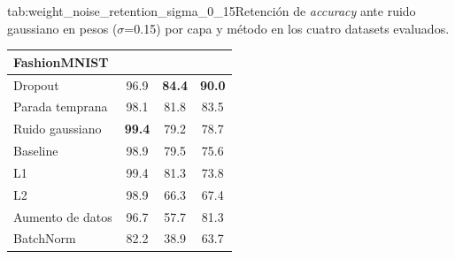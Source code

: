 \begin{table}{tab:weight_noise_retention_sigma_0_15}{Retención de \textit{accuracy} ante ruido gaussiano en pesos ($\sigma$=0.15) por capa y método en los cuatro datasets evaluados.}
\begin{tabular}{lccc}
\multicolumn{4}{l}{\textbf{FashionMNIST}}\\
\midrule
Dropout & 96.9 & \textbf{84.4} & \textbf{90.0} \\
Parada temprana & 98.1 & 81.8 & 83.5 \\
Ruido gaussiano & \textbf{99.4} & 79.2 & 78.7 \\
Baseline & 98.9 & 79.5 & 75.6 \\
L1 & 99.4 & 81.3 & 73.8 \\
L2 & 98.9 & 66.3 & 67.4 \\
Aumento de datos & 96.7 & 57.7 & 81.3 \\
BatchNorm & 82.2 & 38.9 & 63.7 \\
\bottomrule
\end{tabular}
\end{table}